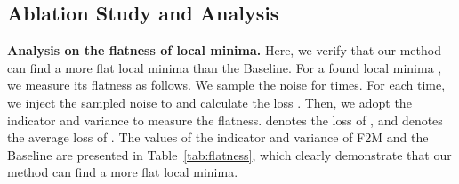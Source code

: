 \documentclass{article}
\begin{document}
\subsection{Ablation Study and Analysis} \label{subsec:ablation}
\begin{table*}[t]
\renewcommand\arraystretch{1.0}
\caption{Comparison of the flatness of the local minima found by the Baseline and our F2M.} 
\label{tab:flatness}
\centering
{}
\end{table*} 
\textbf{Analysis on the flatness of local minima.} Here, we verify that our method can find a more flat local minima than the Baseline. For a found local minima , we measure its flatness as follows. We sample the noise for  times. For each time, we inject the sampled noise to  and calculate the loss . Then, we adopt the indicator  and variance  to measure the flatness.  denotes the loss of , and  denotes the average loss of . The values of the indicator and variance of F2M and the Baseline are presented in Table~\ref{tab:flatness}, which clearly demonstrate that our method can find a more flat local minima. 
\end{document}
